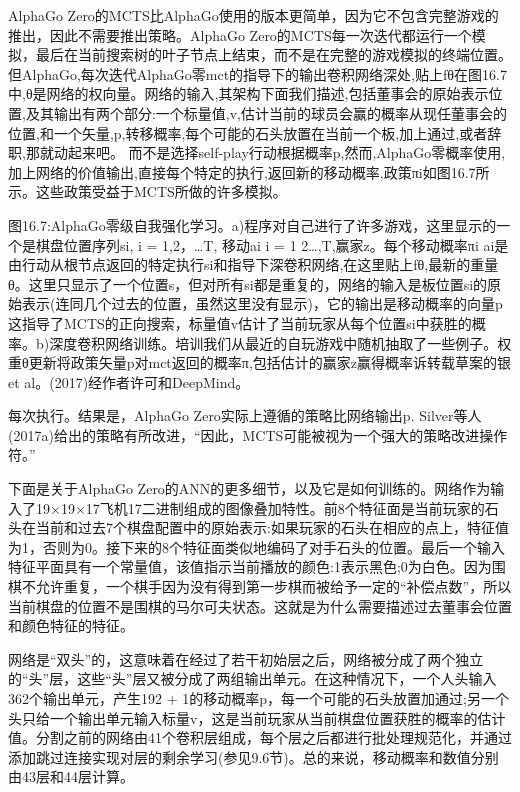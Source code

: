 AlphaGo Zero的MCTS比AlphaGo使用的版本更简单，因为它不包含完整游戏的推出，因此不需要推出策略。AlphaGo Zero的MCTS每一次迭代都运行一个模拟，最后在当前搜索树的叶子节点上结束，而不是在完整的游戏模拟的终端位置。但AlphaGo,每次迭代AlphaGo零mct的指导下的输出卷积网络深处,贴上fθ在图16.7中,θ是网络的权向量。网络的输入,其架构下面我们描述,包括董事会的原始表示位置,及其输出有两个部分:一个标量值,v,估计当前的球员会赢的概率从现任董事会的位置,和一个矢量,p,转移概率,每个可能的石头放置在当前一个板,加上通过,或者辞职,那就动起来吧。
而不是选择self-play行动根据概率p,然而,AlphaGo零概率使用,加上网络的价值输出,直接每个特定的执行,返回新的移动概率,政策πi如图16.7所示。这些政策受益于MCTS所做的许多模拟。

图16.7:AlphaGo零级自我强化学习。a)程序对自己进行了许多游戏，这里显示的一个是棋盘位置序列si, i = 1,2，…T,
移动ai i = 1 2…,T,赢家z。每个移动概率πi ai是由行动从根节点返回的特定执行si和指导下深卷积网络,在这里贴上fθ,最新的重量θ。这里只显示了一个位置s，但对所有si都是重复的，网络的输入是板位置si的原始表示(连同几个过去的位置，虽然这里没有显示)，它的输出是移动概率的向量p
这指导了MCTS的正向搜索，标量值v估计了当前玩家从每个位置si中获胜的概率。b)深度卷积网络训练。培训我们从最近的自玩游戏中随机抽取了一些例子。权重θ更新将政策矢量p对mct返回的概率π,包括估计的赢家z赢得概率诉转载草案的银et al。(2017)经作者许可和DeepMind。


每次执行。结果是，AlphaGo Zero实际上遵循的策略比网络输出p. Silver等人(2017a)给出的策略有所改进，“因此，MCTS可能被视为一个强大的策略改进操作符。”

下面是关于AlphaGo Zero的ANN的更多细节，以及它是如何训练的。网络作为输入了19×19×17飞机17二进制组成的图像叠加特性。前8个特征面是当前玩家的石头在当前和过去7个棋盘配置中的原始表示:如果玩家的石头在相应的点上，特征值为1，否则为0。接下来的8个特征面类似地编码了对手石头的位置。最后一个输入特征平面具有一个常量值，该值指示当前播放的颜色:1表示黑色;0为白色。因为围棋不允许重复，一个棋手因为没有得到第一步棋而被给予一定的“补偿点数”，所以当前棋盘的位置不是围棋的马尔可夫状态。这就是为什么需要描述过去董事会位置和颜色特征的特征。

网络是“双头”的，这意味着在经过了若干初始层之后，网络被分成了两个独立的“头”层，这些“头”层又被分成了两组输出单元。在这种情况下，一个人头输入362个输出单元，产生192 + 1的移动概率p，每一个可能的石头放置加通过;另一个头只给一个输出单元输入标量v，这是当前玩家从当前棋盘位置获胜的概率的估计值。分割之前的网络由41个卷积层组成，每个层之后都进行批处理规范化，并通过添加跳过连接实现对层的剩余学习(参见9.6节)。总的来说，移动概率和数值分别由43层和44层计算。

